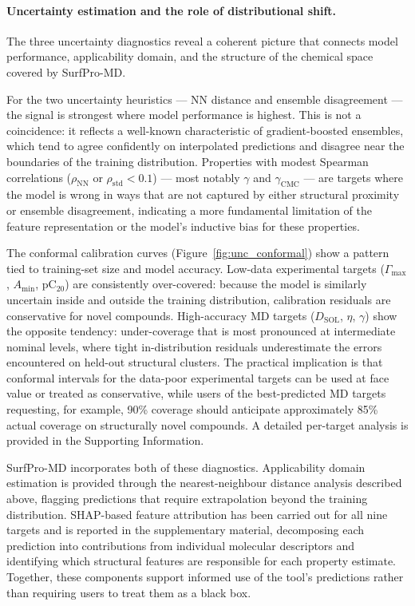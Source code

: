 \documentclass[11pt]{aime}
\begin{document}
\paragraph{Uncertainty estimation and the role of distributional shift.}
The three uncertainty diagnostics reveal a coherent picture that connects model performance, applicability domain, and the structure of the chemical space covered by SurfPro-MD.

For the two uncertainty heuristics --- NN distance and ensemble disagreement --- the signal is strongest where model performance is highest.
This is not a coincidence: it reflects a well-known characteristic of gradient-boosted ensembles, which tend to agree confidently on interpolated predictions and disagree near the boundaries of the training distribution.
Properties with modest Spearman correlations ($\rho_{\mathrm{NN}}$ or $\rho_{\mathrm{std}} < 0.1$) --- most notably $\gamma$ and $\gamma_{\mathrm{CMC}}$ --- are targets where the model is wrong in ways that are not captured by either structural proximity or ensemble disagreement, indicating a more fundamental limitation of the feature representation or the model's inductive bias for these properties.

The conformal calibration curves (Figure~\ref{fig:unc_conformal}) show a pattern tied to training-set size and model accuracy.
Low-data experimental targets ($\Gamma_{\max}$, $A_{\min}$, pC$_{20}$) are consistently over-covered: because the model is similarly uncertain inside and outside the training distribution, calibration residuals are conservative for novel compounds.
High-accuracy MD targets ($D_{\mathrm{SOL}}$, $\eta$, $\gamma$) show the opposite tendency: under-coverage that is most pronounced at intermediate nominal levels, where tight in-distribution residuals underestimate the errors encountered on held-out structural clusters.
The practical implication is that conformal intervals for the data-poor experimental targets can be used at face value or treated as conservative, while users of the best-predicted MD targets requesting, for example, 90\% coverage should anticipate approximately 85\% actual coverage on structurally novel compounds.
A detailed per-target analysis is provided in the Supporting Information.

SurfPro-MD incorporates both of these diagnostics.
Applicability domain estimation is provided through the nearest-neighbour distance analysis described above, flagging predictions that require extrapolation beyond the training distribution.
SHAP-based feature attribution has been carried out for all nine targets and is reported in the supplementary material, decomposing each prediction into contributions from individual molecular descriptors and identifying which structural features are responsible for each property estimate.
Together, these components support informed use of the tool's predictions rather than requiring users to treat them as a black box.
\end{document}
